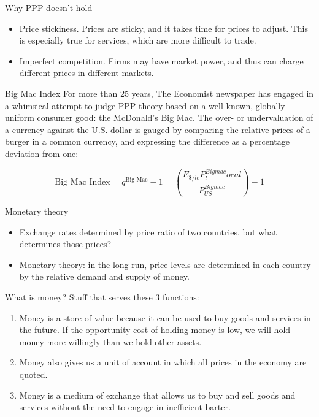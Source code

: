 \documentclass[
  ignorenonframetext,
]{beamer}
\begin{document}
\begin{frame}{Why PPP doesn't hold}
\label{why-ppp-doesnt-hold-1}
\begin{itemize}
\item
  Price stickiness. Prices are sticky, and it takes time for prices to
  adjust. This is especially true for services, which are more difficult
  to trade.
\item
  Imperfect competition. Firms may have market power, and thus can
  charge different prices in different markets.
\end{itemize}
\end{frame}

\begin{frame}{Big Mac Index}
\label{big-mac-index}
For more than 25 years,
\href{https://www.krisna.or.id/post/bigmacindex/}{The Economist
newspaper} has engaged in a whimsical attempt to judge PPP theory based
on a well-known, globally uniform consumer good: the McDonald's Big Mac.
The over- or undervaluation of a currency against the U.S. dollar is
gauged by comparing the relative prices of a burger in a common
currency, and expressing the difference as a percentage deviation from
one:

\begin{equation}
\text{Big Mac Index}=q^{\text{Big Mac}}-1=\left(\frac{E_{\$/lc}P^{Bigmac}_local}{P_{US}^{Bigmac}}\right)-1
\end{equation}
\end{frame}

\begin{frame}{Monetary theory}
\label{monetary-theory}
\begin{itemize}
\item
  Exchange rates determined by price ratio of two countries, but what
  determines those prices?
\item
  Monetary theory: in the long run, price levels are determined in each
  country by the relative demand and supply of money.
\end{itemize}
\end{frame}

\begin{frame}{What is money?}
\label{what-is-money}
Stuff that serves these 3 functions:

\begin{enumerate}
\item
  Money is a store of value because it can be used to buy goods and
  services in the future. If the opportunity cost of holding money is
  low, we will hold money more willingly than we hold other assets.
\item
  Money also gives us a unit of account in which all prices in the
  economy are quoted.
\item
  Money is a medium of exchange that allows us to buy and sell goods and
  services without the need to engage in inefficient barter.
\end{enumerate}
\end{frame}
\end{document}
